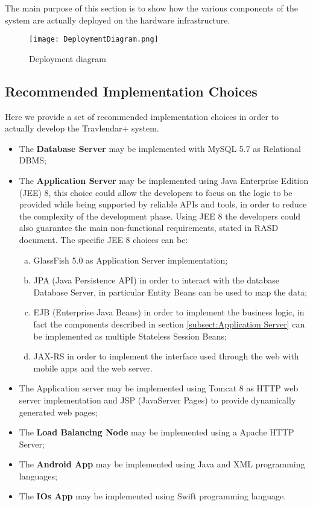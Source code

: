 The main purpose of this section is to show how the various components of the system are actually deployed on the hardware infrastructure.
\begin{figure}[H]
\begin{center}
		\texttt{[image: DeploymentDiagram.png]}
\end{center}
\caption{Deployment diagram}
\end{figure}

\subsection{Recommended Implementation Choices}
\label{subsect:Recommended Implementation Choices}
Here we provide a set of recommended implementation choices in order to actually develop the Travlendar+ system.
\begin{itemize}
	\item The \textbf{Database Server} may be implemented with MySQL 5.7 as Relational DBMS;
	
	\item The \textbf{Application Server} may be implemented using Java Enterprise Edition (JEE) 8, this choice could allow the developers to focus on the logic to be provided while being supported by reliable APIs and tools, in order to reduce the complexity of the development phase. Using JEE 8 the developers could also guarantee the main non-functional requirements, stated in RASD document. The specific JEE 8 choices can be:
	\begin{enumerate}[a)]
		\item GlassFish 5.0 as Application Server implementation;
		\item JPA (Java Persistence API) in order to interact with the database Database Server, in particular Entity Beans can be used to map the data;
		\item EJB (Enterprise Java Beans) in order to implement the business logic, in fact the components described in section \ref{subsect:Application Server} can be implemented as multiple Stateless Session Beans;
		\item JAX-RS in order to implement the interface used through the web with mobile apps and the web server.
	\end{enumerate}
	
	\item The Application server may be implemented using Tomcat 8 as HTTP web server implementation and JSP (JavaServer Pages) to provide dynamically generated web pages;
	
	\item The \textbf{Load Balancing Node} may be implemented using a Apache HTTP Server;
	
	\item The \textbf{Android App} may be implemented using Java and XML programming languages;
	\item The \textbf{IOs App} may be implemented using Swift programming language.
\end{itemize}